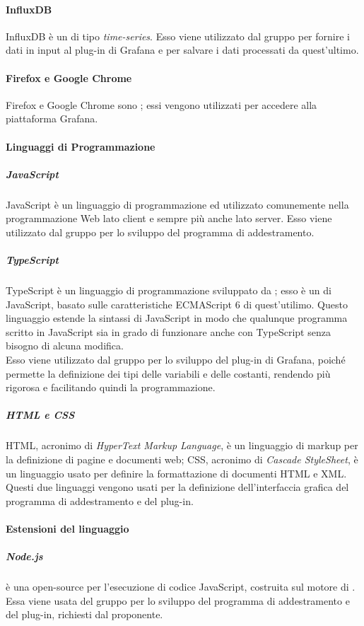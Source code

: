 \documentclass[../norme-di-progetto.tex]{subfiles}
\begin{document}
\paragraph{InfluxDB}
InfluxDB è un  di tipo \textit{time-series}. Esso viene utilizzato dal gruppo per fornire i dati in input al plug-in di Grafana e per salvare i dati processati da quest'ultimo.

\paragraph{Firefox e Google Chrome}
Firefox e Google Chrome sono ; essi vengono utilizzati per accedere alla piattaforma Grafana.

\paragraph{Linguaggi di Programmazione}
\subparagraph{JavaScript}
JavaScript è un linguaggio di programmazione  ed  utilizzato comunemente nella programmazione Web lato client e sempre più anche lato server. Esso viene utilizzato dal gruppo per lo sviluppo del programma di addestramento.

\subparagraph{TypeScript}
TypeScript è un linguaggio di programmazione sviluppato da ; esso è un  di JavaScript, basato sulle caratteristiche ECMAScript 6 di quest'utilimo. Questo linguaggio estende la sintassi di JavaScript in modo che qualunque programma scritto in JavaScript sia in grado di funzionare anche con TypeScript senza bisogno di alcuna modifica. \\
Esso viene utilizzato dal gruppo per lo sviluppo del plug-in di Grafana, poiché permette la definizione dei tipi delle variabili e delle costanti, rendendo più rigorosa e facilitando quindi la programmazione.

\subparagraph{HTML e CSS}
HTML, acronimo di \textit{HyperText Markup Language}, è un linguaggio di markup per la definizione di pagine e documenti web; CSS, acronimo di \textit{Cascade StyleSheet}, è un linguaggio usato per definire la formattazione di documenti HTML e XML. Questi due linguaggi vengono usati per la definizione dell'interfaccia grafica del programma di addestramento e del plug-in.

\paragraph{Estensioni del linguaggio}
\subparagraph{Node.js}
 è una  open-source per l'esecuzione di codice JavaScript, costruita sul motore  di . Essa viene usata del gruppo per lo sviluppo del programma di addestramento e del plug-in, richiesti dal proponente.
\end{document}
